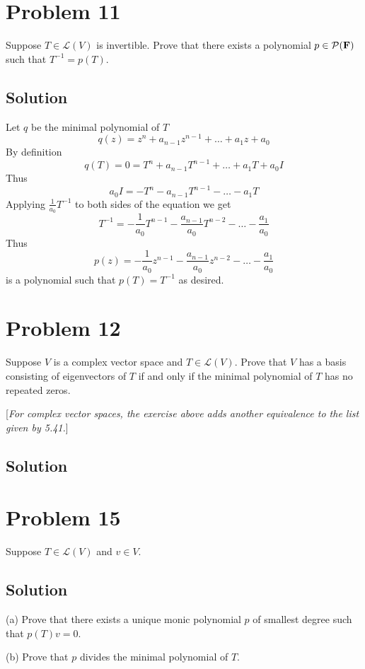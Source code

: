 \documentclass{article}
\begin{document}
\section*{Problem 11}
Suppose $T\in\mathcal{L}(V)$ is invertible. Prove that there exists a polynomial $p\in\mathcal{P}(\mathbf{F})$ such that $T^{-1}=p(T)$.

\subsection*{Solution}
Let $q$ be the minimal polynomial of $T$
\[q(z)=z^n+a_{n-1}z^{n-1}+\ldots+a_1z+a_0\]
By definition
\[q(T)=0=T^n+a_{n-1}T^{n-1}+\ldots+a_1T+a_0I\]
Thus
\[a_0I=-T^n-a_{n-1}T^{n-1}-\ldots-a_1T\]
Applying $\frac{1}{a_0}T^{-1}$ to both sides of the equation we get
\[T^{-1}=-\frac{1}{a_0}T^{n-1}-\frac{a_{n-1}}{a_0}T^{n-2}-\ldots-\frac{a_1}{a_0}\]
Thus
\[p(z)=-\frac{1}{a_0}z^{n-1}-\frac{a_{n-1}}{a_0}z^{n-2}-\ldots-\frac{a_1}{a_0}\]
is a polynomial such that $p(T)=T^{-1}$ as desired.

\section*{Problem 12}
Suppose $V$ is a complex vector space and $T\in\mathcal{L}(V)$. Prove that $V$ has a basis consisting of eigenvectors of $T$ if and only if the minimal polynomial of $T$ has no repeated zeros.

[\textit{For complex vector spaces, the exercise above adds another equivalence to the list given by 5.41.}]

\subsection*{Solution}

\section*{Problem 15}
Suppose $T\in\mathcal{L}(V)$ and $v\in V$.

\subsection*{Solution}
(a) Prove that there exists a unique monic polynomial $p$ of smallest degree such that $p(T)v=0$.

\vs

(b) Prove that $p$ divides the minimal polynomial of $T$.
\end{document}
